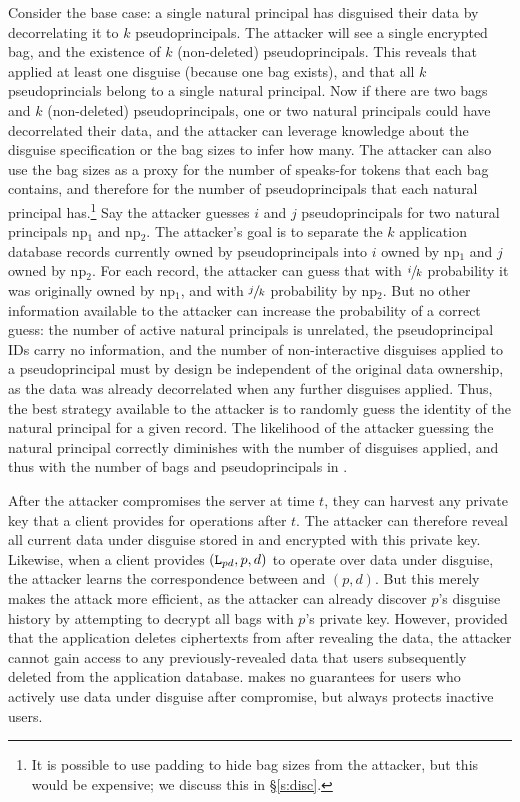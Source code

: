 %
Consider the base case: a single natural principal has disguised their data
by decorrelating it to $k$ pseudoprincipals.
%
The attacker will see a single encrypted bag, and the existence of $k$
(non-deleted) pseudoprincipals.
%
This reveals that \sys applied at least one disguise (because one bag
exists), and that all $k$ pseudoprincials belong to a single natural
principal.
%
Now if there are two bags and $k$ (non-deleted) pseudoprincipals, one
or two natural principals could have decorrelated their data, and the
attacker can leverage knowledge about the disguise specification or
the bag sizes to infer how many.
%
The attacker can also use the bag sizes as a proxy for the number of
speaks-for tokens that each bag contains, and therefore for the number
of pseudoprincipals that each natural principal has.\footnote{It is
possible to use padding to hide bag sizes from the attacker, but this
would be expensive; we discuss this in \S\ref{s:disc}.}
%
Say the attacker guesses $i$ and $j$ pseudoprincipals for two natural
principals np$_1$ and np$_2$.
%
The attacker's goal is to separate the $k$ application database records
currently owned by pseudoprincipals into $i$ owned by np$_1$ and $j$
owned by np$_2$.
%
For each record, the attacker can guess that with $\sfrac{i}{k}$
probability it was originally owned by np$_1$, and with $\sfrac{j}{k}$
probability by np$_2$.
%
But no other information available to the attacker can increase
the probability of a correct guess: the number of active natural
principals is unrelated, the pseudoprincipal IDs carry no information,
and the number of non-interactive disguises applied to a pseudoprincipal
must by design be independent of the original data ownership, as the data
was already decorrelated when any further disguises applied.
%
Thus, the best strategy available to the attacker is to randomly
guess the identity of the natural principal for a given record.
%
The likelihood of the attacker guessing the natural principal correctly
diminishes with the number of disguises applied, and thus with the
number of bags and pseudoprincipals in \sys.
%


%
After the attacker compromises the server at time $t$, they can harvest any
private key that a client provides for operations after $t$.
%
The attacker can therefore reveal all current data under disguise stored in \sys and
encrypted with this private key.
%
Likewise, when a client provides $(\texttt{L}_{pd}, p, d)$ to operate over data under
disguise, the attacker learns the correspondence between  and $(p, d)$.
%
But this merely makes the attack more efficient, as the attacker can already discover
$p$'s disguise history by attempting to decrypt all bags with $p$'s private key.
%
However, provided that the application deletes ciphertexts from \sys after revealing
the data, the attacker cannot gain access to any previously-revealed data that users
subsequently deleted from the application database.
%
\sys makes no guarantees for users who actively use data under disguise after
compromise, but always protects inactive users.
%

